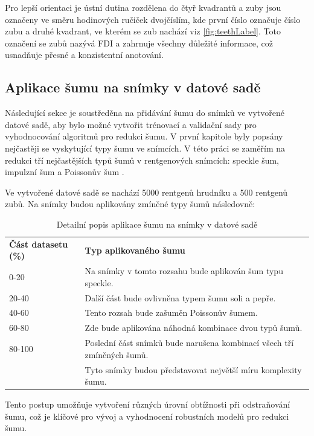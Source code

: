 \documentclass[male,czech,api_ing]{thesis}
\begin{document}
Pro lepší orientaci je ústní dutina rozdělena do čtyř kvadrantů a zuby jsou označeny ve směru hodinových ručiček dvojčíslím, kde první číslo označuje číslo zubu a druhé kvadrant, ve kterém se zub nachází viz \ref{fig:teethLabel}. Toto označení se zubů nazývá FDI a zahrnuje všechny důležité informace, což usnadňuje přesné a konzistentní anotování.

\subsection{Aplikace šumu na snímky v datové sadě}
Následující sekce je soustředěna na přidávání šumu do snímků ve vytvořené datové sadě, aby bylo možné vytvořit trénovací a validační sady pro vyhodnocování algoritmů pro redukci šumu. V první kapitole byly popsány nejčastěji se vyskytující typy šumu ve snímcích. V této práci se zaměřím na redukci tří nejčastějších typů šumů v rentgenových snímcích: speckle šum, impulzní šum a Poissonův šum \cite{MostCommonNoises}.

Ve vytvořené datové sadě se nachází 5000 rentgenů hrudníku a 500 rentgenů zubů. Na snímky budou aplikovány zmíněné typy šumů následovně:

\begin{table}[H]
    \caption{Detailní popis aplikace šumu na snímky v datové sadě}
    \label{table:noiseTypes}
    \begin{tabular}{@{}ll@{}}
        \textbf{Část datasetu (\%)} & \textbf{Typ aplikovaného šumu} \\
        0-20   & Na snímky v tomto rozsahu bude aplikován šum typu speckle. \\
        20-40  & Další část bude ovlivněna typem šumu soli a pepře. \\
        40-60  & Tento rozsah bude zašuměn Poissonův šumem. \\
        60-80  & Zde bude aplikována náhodná kombinace dvou typů šumů. \\
        80-100 & Poslední část snímků bude narušena kombinací všech tří zmíněných šumů. \\ 
               & Tyto snímky budou představovat největší míru komplexity šumu. \\
    \end{tabular}
\end{table}

Tento postup umožňuje vytvoření různých úrovní obtížnosti při odstraňování šumu, což je klíčové pro vývoj a vyhodnocení robustních modelů pro redukci šumu.
\end{document}
